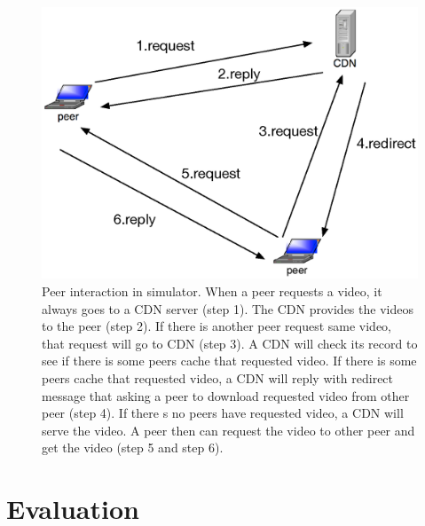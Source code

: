 \documentclass[10pt,final,journal,a4paper]{IEEEtran}
\begin{document}
\begin{figure}[!t]
\begin{center}
\includegraphics[scale=0.4]{graphs/p2p-system-description.eps}
\end{center}
\caption{Peer interaction in simulator.
When a peer requests a video, it always goes to a CDN server (step 1). 
The CDN provides the videos to the peer (step 2). 
If there is another peer request same video, that request will go to CDN (step 3).  
A CDN will check its record to see if there is some peers cache that requested video.  
If there is some peers cache that requested video, a CDN will reply with redirect message that asking a peer to download requested video from other peer (step 4).
If there s no peers have requested video, a CDN will serve the video.   
A peer then can request the video to other peer and get the video (step 5 and step 6).
}
\label{fig:p2pcdninteractioninsimulator}
\end{figure} 



\section{Evaluation}\label{evaluation}
\end{document}
